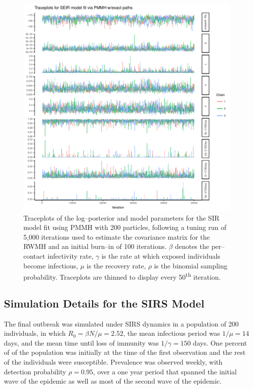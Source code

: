 \begin{figure}[htbp]
	\centering
	\includegraphics[width=0.9\linewidth]{figures/seir_pomp_exact_traceplots}
	\caption[Simulation 1 MCMC traceplots for an SIR model fit using PMMH with exact particle paths.]{Traceplots of the log--posterior and model parameters for the SIR model fit using PMMH with 200 particles, following a tuning run of 5,000 iterations used to estimate the covariance matrix for the RWMH and an initial burn--in of 100 iterations. $ \beta $ denotes the per--contact infectivity rate, $ \gamma $ is the rate at which exposed individuals become infectious, $ \mu $ is the recovery rate, $ \rho $ is the binomial sampling probability. Traceplots are thinned to display every 50\textsuperscript{th} iteration.}
	\label{fig:seirpompexacttraceplots}
\end{figure}

\newpage
\subsection{Simulation Details for the SIRS Model}
The final outbreak was simulated under SIRS dynamics in a population of 200 individuals, in which $ R_0 = \beta N / \mu = 2.52 $, the mean infectious period was $ 1/\mu = 14 $ days, and the mean time until loss of immunity was $ 1/\gamma = 150 $ days. One percent of of the population was initially at the time of the first observation and the rest of the individuals were susceptible. Prevalence was observed weekly, with detection probability $ \rho = 0.95 $, over a one year period that spanned the initial wave of the epidemic as well as most of the second wave of the epidemic. 


